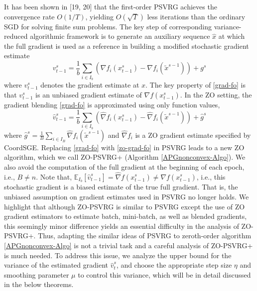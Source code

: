 \documentclass{article}
\newcommand*{\E}{\mathbb{E}}
\theoremstyle{definition}
\theoremstyle{remark}
\begin{document}
{\color{Green}
 {\color{Brown}It has been shown in [19, 20] that the first-order PSVRG achieves the convergence rate $O(1/T )$, yielding $O(\sqrt{T})$ less iterations than the ordinary SGD for solving finite sum problems.}
{\color{Green}
{\color{Brown} The key step of corresponding variance-reduced algorithmic framework is to generate an auxiliary sequence $\hat{x}$ at which the full gradient is used as a reference in building a modified stochastic gradient estimate 
\begin{equation}\label{grad-fo}
{{v}}_{t-1}^s = \frac{1}{b} \sum_{i\in I_b}\left({\nabla} f_{i}(x_{t-1}^s)-{\nabla} f_{i}(\tilde{x}^{s-1})\right)+{g}^s
\end{equation}
where ${{v}}_{t-1}^s$ denotes the gradient estimate at $x$. The key property of \eqref{grad-fo} is that ${{v}}_{t-1}^s$ is an unbiased gradient estimate of $\nabla f(x_{t-1}^s)$. In the ZO setting, the gradient blending \eqref{grad-fo} is approximated using only function values,
\begin{equation}\label{zo-grad-fo}
{\hat{v}}_{t-1}^s = \frac{1}{b} \sum_{i\in I_b}\left(\hat{\nabla} f_{i}(x_{t-1}^s)-\hat{\nabla} f_{i}(\tilde{x}^{s-1})\right)+\hat{g}^s
\end{equation}
where $\hat{g}^s= \frac{1}{B}\sum_{i\in I_B}\hat{\nabla} f_{i}(\tilde{x}^{s-1})$ and $\hat{\nabla} f_{i}$ is a ZO gradient estimate specified by CoordSGE.  Replacing \eqref{grad-fo} with \eqref{zo-grad-fo} in PSVRG leads to a new ZO
algorithm, which we call ZO-PSVRG+ (Algorithm \ref{APGnonconvex-Algo}). We also avoid the computation of the full gradient at the beginning of each epoch, i.e., $B \neq n$.
}
Note that, $\E_{I_b}[\hat{v}_{t-1}^s] = \hat{\nabla} f(x_{t-1}^s) \neq {\nabla} f(x_{t-1}^s)$, i.e., this stochastic gradient is a biased estimate of the true full gradient.
{\color{Brown} That is, the unbiased assumption on gradient estimates used in PSVRG \cite{reddi2016proximal,li2018simple} no longer holds. We highlight that although ZO-PSVRG is similar
to PSVRG except the use of ZO gradient estimators to estimate batch, mini-batch, as well as blended
gradients, this seemingly minor difference yields an essential difficulty in the analysis of ZO-PSVRG+.
}
Thus, adapting the similar ideas of PSVRG to zeroth-order algorithm \ref{APGnonconvex-Algo} is not a trivial task {\color{Brown} and a careful analysis of ZO-PSVRG+ is much needed.} To address this issue, we analyze the upper bound for the variance of the estimated gradient $\hat{v}_t^s$, and choose the appropriate step size $\eta$ and smoothing parameter $\mu$ to control
this variance, which will be in detail discussed in the below theorems.
}
}
\end{document}
